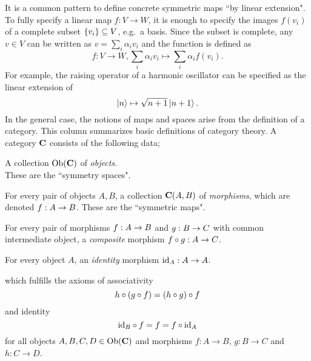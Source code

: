 \begin{doublecol}
    It is a common pattern to define concrete symmetric maps ``by linear extension".
    To fully specify a linear map $f: V \to W$, it is enough to specify the images $f(v_i)$ of a complete subset $\set{v_i} \subseteq V$, e.g.~a basis.
    Since the subset is complete, any $v \in V$ can be written as $v = \sum_i \alpha_i v_i$
    and the function is defined as 
    \begin{equation}
        f: V \to W, \sum_i \alpha_i v_i\mapsto \sum_i \alpha_i f(v_i)
        .
    \end{equation}
    For example, the raising operator of a harmonic oscillator can be specified as the linear extension of $$\ket{n} \mapsto \sqrt{n + 1} \ket{n + 1}.$$
\colswitch
    In the general case, the notions of maps and spaces arise from the definition of a category.
    This column summarizes basic definitions of category theory.
    A category $\mathbf{C}$ consists of the following data;
    \vspace{-1ex} %
    \begin{halfcolitemize}
        \item A collection $\mathrm{Ob}(\mathbf{C})$ of \emph{objects}.
        \\
        These are the ``symmetry spaces".
        \item For every pair of objects $A, B$, a collection $\mathbf{C}(A, B)$ of \emph{morphisms}, which are denoted ${f: A \to B}$.
        These are the ``symmetric maps".
        \item For every pair of morphisms $f: A \to B$ and $g: B \to C$ with common intermediate object, a \emph{composite} morphism $f \circ g: A \to C$.
        \item For every object $A$, an \emph{identity} morphism $\mathrm{id}_{A}: A \to A$.
    \end{halfcolitemize}
    which fulfills the axioms of associativity 
    \begin{equation}
        \label{eq:nonabelian:basics:composition_associative}
        h \circ (g \circ f) = (h \circ g) \circ f
    \end{equation}
    and identity
    \begin{equation}
        \label{eq:nonabelian:basics:composition_identity}
        \mathrm{id}_{B} \circ f = f = f \circ \mathrm{id}_{A}
    \end{equation}
    for all objects $A, B, C, D \in \mathrm{Ob}(\mathbf{C})$ and morphisms $f: A \to B$, $g: B \to C$ and\\ $h: C \to D$.


\end{doublecol}
